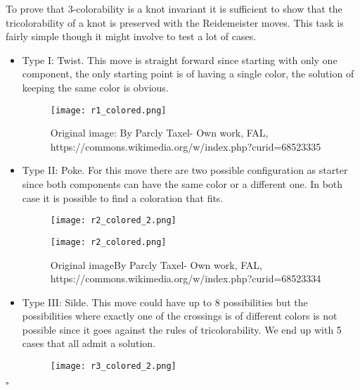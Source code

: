 \documentclass[12pt, a4paper]{article}
\newenvironment{proof}{{\sc Proof:}}{\hfill $\square$}
\begin{document}
\begin{proof}

To prove that 3-colorability is a knot invariant it is sufficient to show that the tricolorability of a knot is preserved with the Reidemeister moves. This task is fairly simple though it might involve to test a lot of cases.

\begin{itemize}
  \item Type I: Twist. This move is straight forward since starting with only one component, the only starting point is of having a single color, the solution of keeping the same color is obvious.
\begin{figure}[H]
             \centering
            \texttt{[image: r1\_colored.png]}
          \caption{Original image: By Parcly Taxel- Own work, FAL, https://commons.wikimedia.org/w/index.php?curid=68523335}
        \label{fig:r_1_colored}
\end{figure}

\item Type II: Poke. For this move there are two possible configuration as starter since both components can have the same color or a different one. In both case it is possible to find a coloration that fits.

\begin{figure}[H]
  \begin{minipage}[c]{.5\textwidth}
             \centering
            \texttt{[image: r2\_colored\_2.png]}
    
  \end{minipage}
  \begin{minipage}[c]{.5\textwidth}
             \centering
            \texttt{[image: r2\_colored.png]}
    
  \end{minipage}
          \caption{Original imageBy Parcly Taxel- Own work, FAL, https://commons.wikimedia.org/w/index.php?curid=68523334}
        \label{fig:r_2_colored}
\end{figure}

\item Type III: Silde. This move could have up to 8 possibilities but the possibilities where exactly one of the crossings is of different colors is not possible since it goes against the rules of tricolorability. We end up with 5 cases that all admit a solution.   

\begin{figure}[H]
  \begin{minipage}[c]{.3\textwidth}
             \centering
            \texttt{[image: r3\_colored\_2.png]}
    

\end{minipage}
\end{figure}
\end{itemize}
\end{proof}
\end{document}
